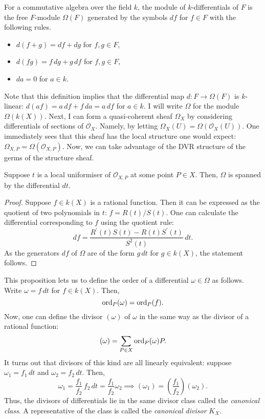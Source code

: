 \begin{defin}
  For a commutative algebra over the field $k$, the module of
  $k$-differentials of $F$ is the free $F$-module $\Omega(F)$ generated
  by the symbols $df$ for $f\in F$ with the following rules.
  \begin{itemize}
    \item $d(f+g)=df+dg$ for $f, g\in F$,
    \item $d(fg)=f\,dg+g\,df$ for $f, g\in F$,
    \item $da = 0$ for $a\in k$.
  \end{itemize}
\end{defin}
Note that this definition implies that the differential map $d:F\to\Omega(F)$
is $k$-linear: $d(af)=a\,df+f\,da=a\,df$ for $a\in k$. I will write
$\Omega$ for the module $\Omega\left(k(X)\right)$. Next, I can form a
quasi-coherent sheaf $\Omega_{X}$ by considering differentials of sections of
$\mathscr{O}_{X}$. Namely, by letting
$\Omega_{X}(U)=\Omega\left(\mathscr{O}_{X}(U)\right)$. One
immediately sees that this sheaf has the local structure one would expect:
$\Omega_{X,P}=\Omega\left(\mathscr{O}_{X,P}\right)$. Now, we can take
advantage of the DVR structure of the germs of the structure sheaf.
\begin{prop}
  Suppose $t$ is a local uniformiser of $\mathscr{O}_{X,P}$ at some
  point $P\in X$. Then, $\Omega$ is spanned by the differential $dt$.
\end{prop}
\begin{proof}
  Suppose $f\in k(X)$ is a rational function. Then it can be expressed as
  the quotient of two polynomials in $t$: $f=R(t)/S(t)$. One can calculate
  the differential corresponding to $f$ using the quotient rule:
  \[
    df = \frac{R^{\prime}(t)S(t)-R(t)S^{\prime}(t)}{S^{2}(t)}\,dt.
  \]
  As the generators $df$ of $\Omega$ are of the form $g\,dt$ for $g\in k(X)$,
  the statement follows.
\end{proof}
This proposition lets us to define the order of a differential
$\omega\in\Omega$ as follows. Write $\omega=f\,dt$ for $f\in k(X)$. Then,
\[
  \operatorname{ord}_{P}(\omega)=\operatorname{ord}_{P}(f).
\]
Now, one can define the divisor $(\omega)$ of $\omega$ in the same way as
the divisor of a rational function:
\[
  (\omega)=\sum_{P\in X}\operatorname{ord}_{P}(\omega)P.
\]
It turns out that divisors of this kind are all linearly equivalent: suppose
$\omega_{1}=f_{1}\,dt$ and $\omega_{2}=f_{2}\,dt$. Then,
\[
  \omega_{1}=\frac{f_{1}}{f_{2}}\, f_{2}\,dt=\frac{f_{1}}{f_{2}}\omega_{2}
  \implies (\omega_{1})=\left(\frac{f_{1}}{f_{2}}\right)(\omega_{2}).
\]
Thus, the divisors of differentials lie in the same divisor class called the
\emph{canonical class}. A representative of the class is called the
\emph{canonical divisor} $K_{X}$.


